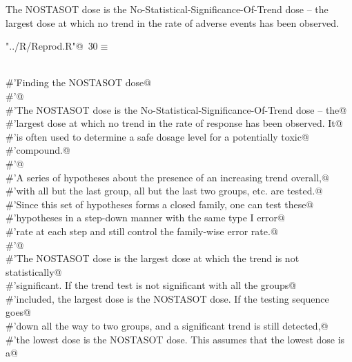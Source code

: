 \documentclass[reqno]{amsart}
\renewcommand{\NWtarget}[2]{\hypertarget{#1}{#2}}
\begin{document}
The NOSTASOT dose is the No-Statistical-Significance-Of-Trend dose -- the largest dose 
at which no trend in the rate of adverse events has been observed. 

\begin{flushleft} \small\label{scrap42}\raggedright\small
\NWtarget{nuweb30}{} \verb@"../R/Reprod.R"@\nobreak\ {\footnotesize {30}}$\equiv$
\vspace{-1ex}
\begin{list}{}{} \item
\mbox{}\verb@@\\
\mbox{}\verb@#'Finding the NOSTASOT dose@\\
\mbox{}\verb@#'@\\
\mbox{}\verb@#'The NOSTASOT dose is the No-Statistical-Significance-Of-Trend dose -- the@\\
\mbox{}\verb@#'largest dose at which no trend in the rate of response has been observed. It@\\
\mbox{}\verb@#'is often used to determine a safe dosage level for a potentially toxic@\\
\mbox{}\verb@#'compound.@\\
\mbox{}\verb@#'@\\
\mbox{}\verb@#'A series of hypotheses about the presence of an increasing trend overall,@\\
\mbox{}\verb@#'with all but the last group, all but the last two groups, etc.  are tested.@\\
\mbox{}\verb@#'Since this set of hypotheses forms a closed family, one can test these@\\
\mbox{}\verb@#'hypotheses in a step-down manner with the same  type I error@\\
\mbox{}\verb@#'rate at each step and still control the family-wise error rate.@\\
\mbox{}\verb@#'@\\
\mbox{}\verb@#'The NOSTASOT dose is the largest dose at which the trend is not statistically@\\
\mbox{}\verb@#'significant. If the trend test is not significant with all the groups@\\
\mbox{}\verb@#'included, the largest dose is the NOSTASOT dose. If the testing sequence goes@\\
\mbox{}\verb@#'down all the way to two groups, and a significant trend is still detected,@\\
\mbox{}\verb@#'the lowest dose is the NOSTASOT dose. This assumes that the lowest dose is a@\\

\end{list}
\end{flushleft}
\end{document}
